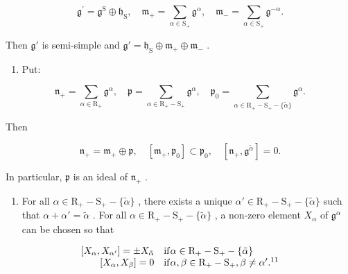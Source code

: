 \[
\mathfrak {g} ^ {\prime} = \mathfrak {g} ^ {\mathrm{S}} \oplus \mathfrak {h} _ {\mathrm{S}}, \quad \mathfrak {m} _ {+} = \sum_ {\alpha \in \mathrm{S} _ {+}} \mathfrak {g} ^ {\alpha}, \quad \mathfrak {m} _ {-} = \sum_ {\alpha \in \mathrm{S} _ {+}} \mathfrak {g} ^ {- \alpha}.
\]

Then \(\mathfrak{g}'\) is semi-simple and \(\mathfrak{g}' = \mathfrak{h}_{\mathrm{S}} \oplus \mathfrak{m}_{+} \oplus \mathfrak{m}_{-}\) .

\begin{enumerate}
\def\labelenumi{\alph{enumi})}
\setcounter{enumi}{1}
\tightlist
\item
  Put:
\end{enumerate}

\[
\mathfrak {n} _ {+} = \sum_ {\alpha \in \mathrm{R} _ {+}} \mathfrak {g} ^ {\alpha}, \quad \mathfrak {p} = \sum_ {\alpha \in \mathrm{R} _ {+} - \mathrm{S} _ {+}} \mathfrak {g} ^ {\alpha}, \quad \mathfrak {p} _ {0} = \sum_ {\alpha \in \mathrm{R} _ {+} - \mathrm{S} _ {+} - \{\tilde {\alpha} \}} \mathfrak {g} ^ {\alpha}.
\]

Then

\[
\mathfrak {n} _ {+} = \mathfrak {m} _ {+} \oplus \mathfrak {p}, \quad [ \mathfrak {m} _ {+}, \mathfrak {p} _ {0} ] \subset \mathfrak {p} _ {0}, \quad [ \mathfrak {n} _ {+}, \mathfrak {g} ^ {\tilde {\alpha}} ] = 0.
\]

In particular, \(\mathfrak{p}\) is an ideal of \(\mathfrak{n}_{+}\) .

\begin{enumerate}
\def\labelenumi{\alph{enumi})}
\setcounter{enumi}{2}
\tightlist
\item
  For all \(\alpha \in \mathrm{R}_{+} - \mathrm{S}_{+} - \{\tilde{\alpha}\}\) , there exists a unique \(\alpha' \in \mathrm{R}_{+} - \mathrm{S}_{+} - \{\tilde{\alpha}\}\) such that \(\alpha + \alpha' = \tilde{\alpha}\) . For all \(\alpha \in \mathrm{R}_{+} - \mathrm{S}_{+} - \{\tilde{\alpha}\}\) , a non-zero element \(X_{\alpha}\) of \(\mathfrak{g}^{\alpha}\) can be chosen so that
\end{enumerate}

\[
\begin{array}{r l} {[ X _ {\alpha}, X _ {\alpha^ {\prime}} ] = \pm X _ {\tilde {\alpha}}} & {\mathrm{if} \alpha \in \mathrm{R} _ {+} - \mathrm{S} _ {+} - \{\tilde {\alpha} \}} \\ {[ X _ {\alpha}, X _ {\beta} ] = 0} & {\mathrm{if} \alpha , \beta \in \mathrm{R} _ {+} - \mathrm{S} _ {+}, \beta \neq \alpha^ {\prime}. ^ {1 1}} \end{array}
\]

